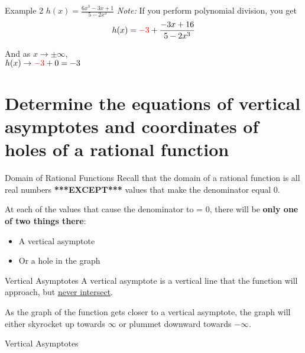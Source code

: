 \documentclass[t,usenames,dvipsnames]{beamer}
\begin{document}
\begin{frame}{Example 2 \quad $h(x) = \tfrac{6x^3-3x+1}{5-2x^3}$}
\emph{Note:} If you perform polynomial division, you get
\[
h(x) = {\color{red}-3} + \frac{-3x+16}{5-2x^3}
\]

And as $x \to \pm \infty$, \newline\\
$h(x) \to {\color{red}-3} + 0 = -3$
\end{frame}


\section{Determine the equations of vertical asymptotes and coordinates of holes of a rational function}

\begin{frame}{Domain of Rational Functions}
Recall that the \alert{domain} of a rational function is all real numbers {\color{blue}\textbf{***EXCEPT***}} values that make the \alert{denominator equal 0}.   \newline\\ \pause

At each of the values that cause the denominator to = 0, there will be \textbf{only one of two things there}:  \newline\\ \pause
\begin{itemize}
    \item A vertical asymptote \newline\\ \pause
    \item Or a hole in the graph
\end{itemize}
\end{frame}

\begin{frame}{Vertical Asymptotes}
A \alert{vertical asymptote} is a vertical line that the function will approach, but \underline{never intersect}.    \newline\\ \pause

As the graph of the function gets closer to a vertical asymptote, the graph will either skyrocket up towards $\infty$ or plummet downward towards $-\infty$. 
\end{frame}

\begin{frame}{Vertical Asymptotes}
\begin{center}
\end{center}
\end{frame}
\end{document}
